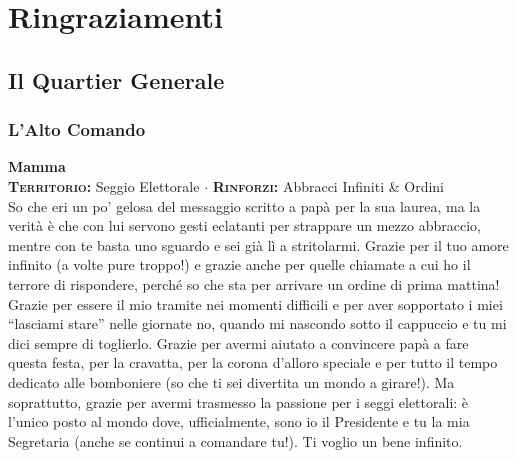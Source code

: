 
\chapter*{Ringraziamenti}
\setlength{\parindent}{0pt}

\section*{Il Quartier Generale}

\subsection*{L'Alto Comando}

\noindent\begin{minipage}{\linewidth}
\textbf{Mamma} \\
{\footnotesize \textbf{\textsc{Territorio:}} Seggio Elettorale $\cdot$ \textbf{\textsc{Rinforzi:}} Abbracci Infiniti \& Ordini} \\
So che eri un po' gelosa del messaggio scritto a papà per la sua laurea, ma la verità è che con lui servono gesti eclatanti per strappare un mezzo abbraccio, mentre con te basta uno sguardo e sei già lì a stritolarmi. Grazie per il tuo amore infinito (a volte pure troppo!) e grazie anche per quelle chiamate a cui ho il terrore di rispondere, perché so che sta per arrivare un ordine di prima mattina! Grazie per essere il mio tramite nei momenti difficili e per aver sopportato i miei ``lasciami stare'' nelle giornate no, quando mi nascondo sotto il cappuccio e tu mi dici sempre di toglierlo. Grazie per avermi aiutato a convincere papà a fare questa festa, per la cravatta, per la corona d'alloro speciale e per tutto il tempo dedicato alle bomboniere (so che ti sei divertita un mondo a girare!). Ma soprattutto, grazie per avermi trasmesso la passione per i seggi elettorali: è l'unico posto al mondo dove, ufficialmente, sono io il Presidente e tu la mia Segretaria (anche se continui a comandare tu!). Ti voglio un bene infinito.
\end{minipage}
\vspace{0.6cm}

